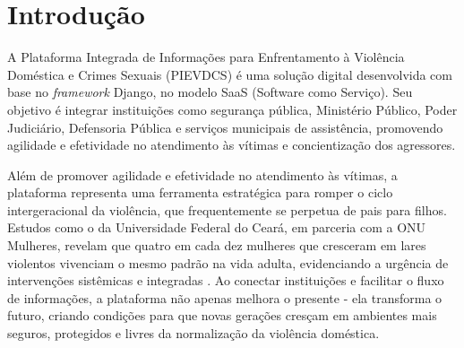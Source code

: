
%
%
%
\section{Introdução}

\noindent \begin{minipage}[c]{0.6\textwidth}
  \vspace {1cm}
  A Plataforma Integrada de Informações para Enfrentamento à Violência Doméstica e Crimes Sexuais (PIEVDCS) é uma solução digital desenvolvida com base no \textit{framework} Django, no modelo SaaS (Software como Serviço). Seu objetivo é integrar instituições como segurança pública, Ministério Público, Poder Judiciário, Defensoria Pública e serviços municipais de assistência, promovendo agilidade e efetividade no atendimento às vítimas e concientização dos agressores.

  Além de promover agilidade e efetividade no atendimento às vítimas, a plataforma representa uma ferramenta estratégica para romper o ciclo intergeracional da violência, que frequentemente se perpetua de pais para filhos. Estudos como o da Universidade Federal do Ceará, em parceria com a ONU Mulheres, revelam que quatro em cada dez mulheres que cresceram em lares violentos vivenciam o mesmo padrão na vida adulta, evidenciando a urgência de intervenções sistêmicas e integradas \cite{carvalho2017transmissao}. Ao conectar instituições e facilitar o fluxo de informações, a plataforma não apenas melhora o presente - ela transforma o futuro, criando condições para que novas gerações cresçam em ambientes mais seguros, protegidos e livres da normalização da violência doméstica.

\end{minipage}
